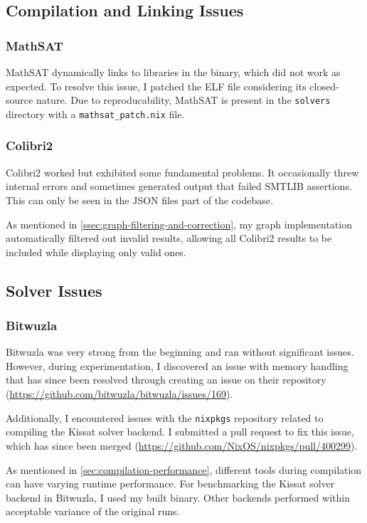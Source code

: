 \documentclass[a4paper]{report}
\begin{document}
\subsection{Compilation and Linking Issues}
\label{ssec:compilation-linkage-issues}
\subsubsection{MathSAT}
\label{sssec:mathsat-issues}
MathSAT dynamically links to libraries in the binary, which did not work as expected.
To resolve this issue, I patched the ELF file considering its closed-source nature.
Due to reproducability, MathSAT is present in the \texttt{solvers} directory with a \texttt{mathsat\_patch.nix} file.

\subsubsection{Colibri2}
\label{sssec:colibri2-issues}
Colibri2 worked but exhibited some fundamental problems.
It occasionally threw internal errors and sometimes generated output that failed SMTLIB assertions.
This can only be seen in the JSON files part of the codebase.

As mentioned in \ref{ssec:graph-filtering-and-correction}, my graph implementation automatically filtered out invalid results, allowing all Colibri2 results to be included while displaying only valid ones.

\subsection{Solver Issues}
\label{ssec:benchmark-solver-issues}
\subsubsection{Bitwuzla}
\label{sssec:bitwuzla-issues}
Bitwuzla was very strong from the beginning and ran without significant issues.
However, during experimentation, I discovered an issue with memory handling that has since been resolved through creating an issue on their repository (\url{https://github.com/bitwuzla/bitwuzla/issues/169}).

Additionally, I encountered issues with the \texttt{nixpkgs} repository related to compiling the Kissat solver backend.
I submitted a pull request to fix this issue, which has since been merged (\url{https://github.com/NixOS/nixpkgs/pull/400299}).

As mentioned in \ref{sec:compilation-performance}, different tools during compilation can have varying runtime performance.
For benchmarking the Kissat solver backend in Bitwuzla, I used my built binary.
Other backends performed within acceptable variance of the original runs.
\end{document}
